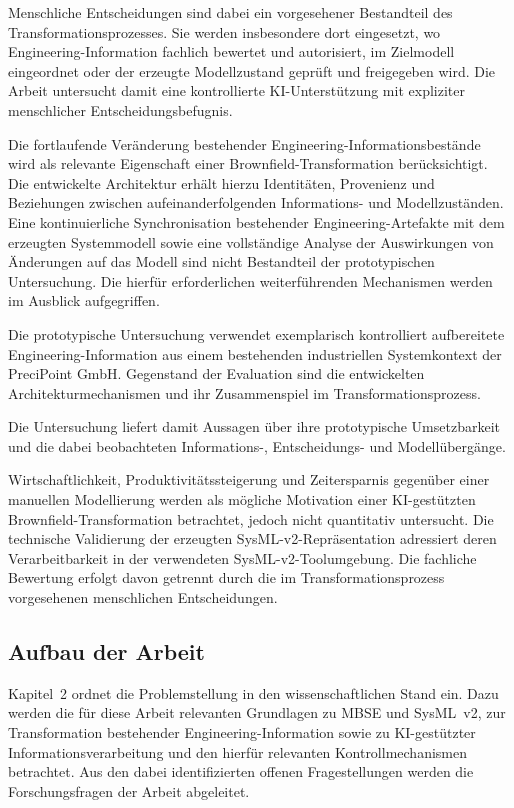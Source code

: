 Menschliche Entscheidungen sind dabei ein vorgesehener Bestandteil des
Transformationsprozesses. Sie werden insbesondere dort eingesetzt, wo
Engineering-Information fachlich bewertet und autorisiert, im Zielmodell
eingeordnet oder der erzeugte Modellzustand geprüft und freigegeben wird.
Die Arbeit untersucht damit eine kontrollierte KI-Unterstützung mit
expliziter menschlicher Entscheidungsbefugnis.

Die fortlaufende Veränderung bestehender Engineering-Informationsbestände
wird als relevante Eigenschaft einer Brownfield-Transformation
berücksichtigt. Die entwickelte Architektur erhält hierzu Identitäten,
Provenienz und Beziehungen zwischen aufeinanderfolgenden Informations- und
Modellzuständen. Eine kontinuierliche Synchronisation bestehender
Engineering-Artefakte mit dem erzeugten Systemmodell sowie eine vollständige
Analyse der Auswirkungen von Änderungen auf das Modell sind nicht Bestandteil
der prototypischen Untersuchung. Die hierfür erforderlichen weiterführenden
Mechanismen werden im Ausblick aufgegriffen.

Die prototypische Untersuchung verwendet exemplarisch kontrolliert
aufbereitete Engineering-Information aus einem bestehenden industriellen
Systemkontext der PreciPoint GmbH. Gegenstand der Evaluation sind die entwickelten Architekturmechanismen und 
ihr Zusammenspiel im Transformationsprozess. 

\noindent Die Untersuchung liefert damit 
Aussagen über ihre prototypische Umsetzbarkeit und die dabei beobachteten
Informations-, Entscheidungs- und Modellübergänge.

Wirtschaftlichkeit, Produktivitätssteigerung und Zeitersparnis gegenüber
einer manuellen Modellierung werden als mögliche Motivation einer
KI-gestützten Brownfield-Transformation betrachtet, jedoch nicht quantitativ
untersucht. Die technische Validierung der erzeugten
SysML-v2-Repräsentation adressiert deren Verarbeitbarkeit in der verwendeten
SysML-v2-Toolumgebung. Die fachliche Bewertung erfolgt davon getrennt durch
die im Transformationsprozess vorgesehenen menschlichen Entscheidungen.

\subsection{Aufbau der Arbeit}
\label{sec:aufbau}

Kapitel~2 ordnet die Problemstellung in den wissenschaftlichen Stand ein.
Dazu werden die für diese Arbeit relevanten Grundlagen zu MBSE und
SysML~v2, zur Transformation bestehender Engineering-Information sowie zu
KI-gestützter Informationsverarbeitung und den hierfür relevanten
Kontrollmechanismen betrachtet. Aus den dabei identifizierten offenen
Fragestellungen werden die Forschungsfragen der Arbeit abgeleitet.

